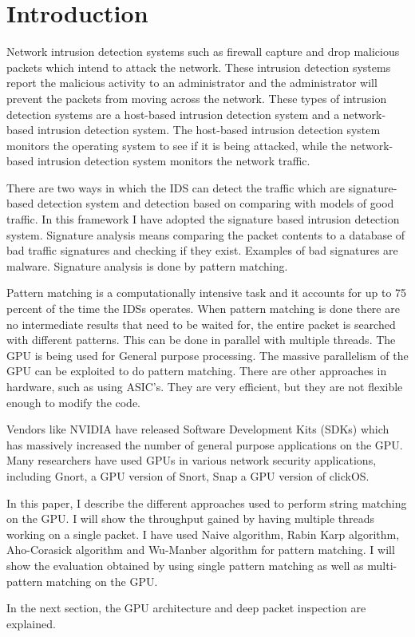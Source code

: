 \chapter{Introduction}

Network intrusion detection systems such as firewall capture and drop malicious packets which intend to attack the network. These intrusion detection systems report the malicious activity to an administrator and the administrator will prevent the packets from moving across the network. These types of intrusion detection systems are a host-based intrusion detection system and a network-based intrusion detection system. The host-based intrusion detection system monitors the operating system to see if it is being attacked, while the network-based intrusion detection system monitors the network traffic.

There are two ways in which the IDS can detect the traffic which are signature-based detection system and detection based on comparing with models of good traffic. In this framework I have adopted the signature based intrusion detection system. Signature analysis means comparing the packet contents to a database of bad traffic signatures and checking if they exist. Examples of bad signatures are malware. Signature analysis is done by pattern matching. 

Pattern matching is a computationally intensive task and it accounts for up to 75 percent of the time the IDSs operates. When pattern matching is done there are no intermediate results that need to be waited for, the entire packet is searched with different patterns. This can be done in parallel with multiple threads. The GPU is being used for General purpose processing. The massive parallelism of the GPU can be exploited to do pattern matching. There are other approaches in hardware, such as using ASIC’s. They are very efficient, but they are not flexible enough to modify the code. 

Vendors like NVIDIA have released Software Development Kits (SDKs) which has massively increased the number of general purpose applications on the GPU. Many researchers have used GPUs in various network security applications, including Gnort, a GPU version of Snort, Snap a GPU version of clickOS. 

In this paper, I describe the different approaches used to perform string matching on the GPU. I will show the throughput gained by having multiple threads working on a single packet. 
I have used Naive algorithm, Rabin Karp algorithm, Aho-Corasick algorithm and Wu-Manber algorithm for pattern matching. I will show the evaluation obtained by using single pattern matching as well as multi-pattern matching on the GPU.

In the next section, the GPU architecture and deep packet inspection are explained. 